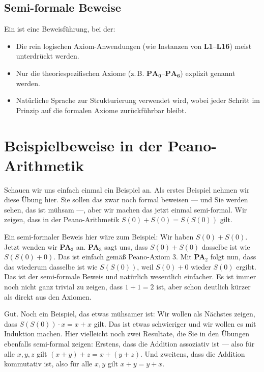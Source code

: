 \subsection{Semi-formale Beweise}
\begin{math-stroke}
\begin{definition}
Ein  ist eine Beweisführung, bei der:
\begin{itemize}
    \item Die rein logischen Axiom-Anwendungen (wie Instanzen von \textbf{L1}--\textbf{L16}) meist unterdrückt werden.
    \item Nur die theoriespezifischen Axiome (z.\,B. $\mathbf{PA_0}$--$\mathbf{PA_6}$) explizit genannt werden.
    \item Natürliche Sprache zur Strukturierung verwendet wird, wobei jeder Schritt im Prinzip auf die formalen Axiome zurückführbar bleibt.
\end{itemize}
\end{definition}
\end{math-stroke}

\section{Beispielbeweise in der Peano-Arithmetik}

\begin{spoken-clean}[00:20:50 - 00:24:50]
Schauen wir uns einfach einmal ein Beispiel an. Als erstes Beispiel nehmen wir diese Übung hier. Sie sollen das zwar noch formal beweisen --- und Sie werden sehen, das ist mühsam ---, aber wir machen das jetzt einmal semi-formal. Wir zeigen, dass in der Peano-Arithmetik $S(0) + S(0) = S(S(0))$ gilt.

Ein semi-formaler Beweis hier wäre zum Beispiel: Wir haben $S(0) + S(0)$. Jetzt wenden wir \textbf{PA$_3$} an. \textbf{PA$_3$} sagt uns, dass $S(0) + S(0)$ dasselbe ist wie $S(S(0) + 0)$. Das ist einfach gemäß Peano-Axiom 3. Mit \textbf{PA$_2$} folgt nun, dass das wiederum dasselbe ist wie $S(S(0))$, weil $S(0) + 0$ wieder $S(0)$ ergibt. Das ist der semi-formale Beweis und natürlich wesentlich einfacher. Es ist immer noch nicht ganz trivial zu zeigen, dass $1 + 1 = 2$ ist, aber schon deutlich kürzer als direkt aus den Axiomen.

Gut. Noch ein Beispiel, das etwas mühsamer ist: Wir wollen als Nächstes zeigen, dass $S(S(0)) \cdot x = x + x$ gilt. Das ist etwas schwieriger und wir wollen es mit Induktion machen. Hier vielleicht noch zwei Resultate, die Sie in den Übungen ebenfalls semi-formal zeigen: Erstens, dass die Addition assoziativ ist --- also für alle $x, y, z$ gilt $(x + y) + z = x + (y + z)$. Und zweitens, dass die Addition kommutativ ist, also für alle $x, y$ gilt $x + y = y + x$.
\end{spoken-clean}

